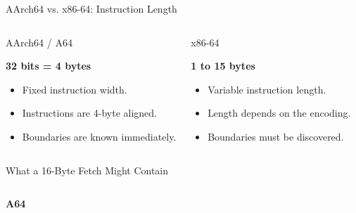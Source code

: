 \documentclass[aspectratio=169,11pt,t]{beamer}
\newcommand{\key}[1]{\textbf{#1}}
\begin{document}
\begin{frame}{AArch64 vs. x86-64: Instruction Length}

\begin{columns}[T,onlytextwidth]


\begin{block}{AArch64 / A64}

\begin{center}
\large
\key{32 bits = 4 bytes}
\end{center}

\begin{itemize}
  \item Fixed instruction width.
  \item Instructions are 4-byte aligned.
  \item Boundaries are known immediately.
\end{itemize}

\end{block}


\begin{block}{x86-64}

\begin{center}
\large
\key{1 to 15 bytes}
\end{center}

\begin{itemize}
  \item Variable instruction length.
  \item Length depends on the encoding.
  \item Boundaries must be discovered.
\end{itemize}

\end{block}

\end{columns}

\vspace{0.15cm}

\begin{block}{What a 16-Byte Fetch Might Contain}

\begin{columns}[T,onlytextwidth]


\vspace{0.05cm}

\centering

\textbf{A64}


\end{columns}
\end{block}
\end{frame}
\end{document}

